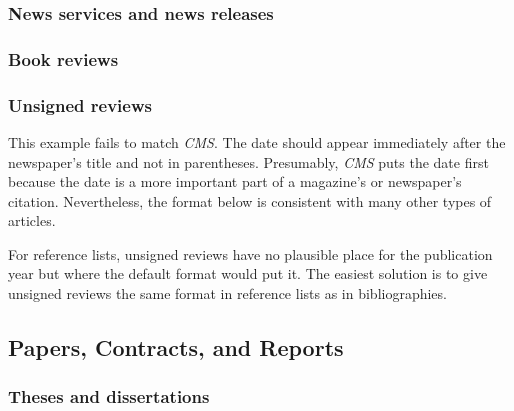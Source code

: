 \documentclass[11pt,letterpaper,oneside]{article}
\begin{document}
\subsubsection{News services and news releases}

\begin{citebib}
\item \cite{ap2015}
\end{citebib}

\setcounter{subsubsection}{201}
\subsubsection{Book reviews}

\begin{citebib}
\item \cite[B13--B14]{ratliff1999}
\item \cite{brehm2015}
\end{citebib}

\setcounter{subsubsection}{203}
\subsubsection{Unsigned reviews}

This example fails to match \textit{CMS}. The date should appear
immediately after the newspaper's title and not in parentheses.
Presumably, \textit{CMS} puts the date first because the date is a
more important part of a magazine's or newspaper's citation.
Nevertheless, the format below is consistent with many other types of
articles.

For reference lists, unsigned reviews have no plausible place for the
publication year but where the default format would put it. The
easiest solution is to give unsigned reviews the same format in
reference lists as in bibliographies.

\begin{citebib}
\item \cite{zeitung1828}
\end{citebib}

\setcounter{subsection}{6}
\subsection{Papers, Contracts, and Reports}
\setcounter{subsection}{14}

\setcounter{subsubsection}{214}
\subsubsection{Theses and dissertations}
\end{document}
